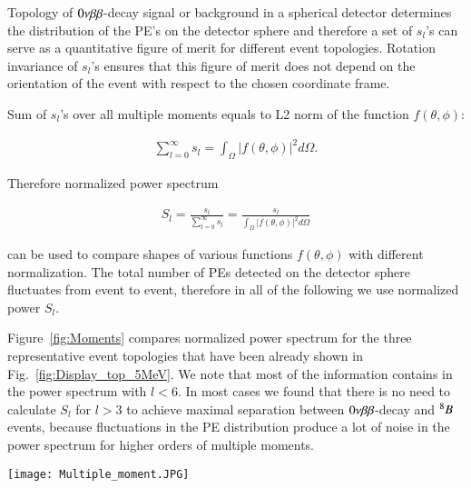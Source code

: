 Topology of $0\nu\beta\beta$-decay signal or background in a spherical detector determines the distribution of the PE's on the detector sphere and therefore a set of $s_l$'s can serve as a quantitative figure of merit for different event topologies. Rotation invariance of $s_l$'s ensures that this figure of merit does not depend on the orientation of the event with respect to the chosen coordinate frame.


Sum of $s_l$'s over all multiple moments equals to L2 norm of the function $f(\theta,\phi)$:

\begin{eqnarray}
\label{eq5}
\sum_{l=0}^{\infty} s_l = \int_{\Omega} |f(\theta,\phi)|^2 d\Omega.
\end{eqnarray}

Therefore normalized power spectrum 

\begin{eqnarray}
\label{eq5}
S_l = \frac{s_l}{\sum_{l=0}^{\infty} s_l} =  \frac{s_l}{\int_{\Omega} |f(\theta,\phi)|^2 d\Omega}
\end{eqnarray}

can be used to compare shapes of various functions $f(\theta,\phi)$ with different normalization. The total number of PEs detected on the detector sphere fluctuates from event to event, therefore in all of the following we use normalized power $S_l$.

Figure~\ref{fig:Moments} compares normalized power spectrum for the three representative event topologies that have been already shown in Fig.~\ref{fig:Display_top_5MeV}. We note that most of the information contains in the power spectrum with $l<$6. In most cases we found that there is no need to calculate $S_l$ for $l>$3 to achieve maximal separation between $0\nu\beta\beta$-decay and $^{8}B$ events, because fluctuations in the PE distribution produce a lot of noise in the power spectrum for higher orders of multiple moments.


\begin{figure*}[h]
  \centering
  \texttt{[image: Multiple\_moment.JPG]}
  \caption{Average $S_l$ values for two electrons at 180 degree
    (\emph{color1}) and 90 degree (\emph{color2}) 1.5~MeV each and a
    single electron (\emph{color3}) with the energy of 3~MeV. Error
    bars are RMS values of each corresponding individual $S_l$
    distribution (each consists of 1000 events simulated at the center
    of the detector) indicating typical event-by-event variation.}
\label{fig:Moments}
\end{figure*}


